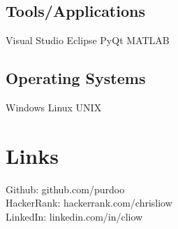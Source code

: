 \documentclass[letterpaper]{deedy-resume} %
\begin{document}
\begin{minipage}[t]{0.33\textwidth}
\subsection{Tools/Applications}
Visual Studio \textbullet{} Eclipse \textbullet{} PyQt \textbullet{} MATLAB

\sectionsep
\subsection{Operating Systems}
Windows \textbullet{} Linux \textbullet{} UNIX

\sectionsep %

\section{Links} 

Github: github.com/purdoo \\
HackerRank: hackerrank.com/chrisliow \\
LinkedIn: linkedin.com/in/cliow \\


\sectionsep %


\end{minipage} %
\hfill
%
%
\end{document}
